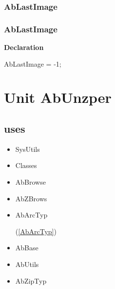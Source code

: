 \documentclass{report}
\newif\ifpdf
\begin{document}
\subsection*{\large{\textbf{AbLastImage}}\normalsize\hspace{1ex}\hrulefill}
\else
\subsection*{AbLastImage}
\fi
\label{AbArcTyp-AbLastImage}
\begin{list}{}{
\setlength{\itemindent}{0cm}
\setlength{\listparindent}{0cm}
\setlength{\leftmargin}{\evensidemargin}
\addtolength{\leftmargin}{\tmplength}
\settowidth{\labelsep}{X}
\addtolength{\leftmargin}{\labelsep}
\setlength{\labelwidth}{\tmplength}
}
\item[\textbf{Declaration}\hfill]
\ifpdf
\begin{flushleft}
\fi
\begin{ttfamily}
AbLastImage = -1;\end{ttfamily}

\ifpdf
\end{flushleft}
\fi

\end{list}
\chapter{Unit AbUnzper}
\label{AbUnzper}
\section{uses}
\begin{itemize}
\item \begin{ttfamily}SysUtils\end{ttfamily}\item \begin{ttfamily}Classes\end{ttfamily}\item \begin{ttfamily}AbBrowse\end{ttfamily}\item \begin{ttfamily}AbZBrows\end{ttfamily}\item \begin{ttfamily}AbArcTyp\end{ttfamily}(\ref{AbArcTyp})\item \begin{ttfamily}AbBase\end{ttfamily}\item \begin{ttfamily}AbUtils\end{ttfamily}\item \begin{ttfamily}AbZipTyp\end{ttfamily}\end{itemize}
\end{document}
